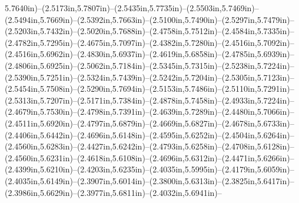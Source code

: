 5.7640in)--(2.5173in,5.7807in)--(2.5435in,5.7735in)--(2.5503in,5.7469in)--(2.5494in,5.7669in)--(2.5392in,5.7663in)--(2.5100in,5.7490in)--(2.5297in,5.7479in)--(2.5203in,5.7432in)--(2.5020in,5.7688in)--(2.4758in,5.7512in)--(2.4584in,5.7335in)--(2.4782in,5.7295in)--(2.4675in,5.7097in)--(2.4382in,5.7280in)--(2.4516in,5.7092in)--(2.4516in,5.6962in)--(2.4830in,5.6937in)--(2.4619in,5.6858in)--(2.4785in,5.6939in)--(2.4806in,5.6925in)--(2.5062in,5.7184in)--(2.5345in,5.7315in)--(2.5238in,5.7224in)--(2.5390in,5.7251in)--(2.5324in,5.7439in)--(2.5242in,5.7204in)--(2.5305in,5.7123in)--(2.5454in,5.7508in)--(2.5290in,5.7694in)--(2.5153in,5.7486in)--(2.5110in,5.7291in)--(2.5313in,5.7207in)--(2.5171in,5.7384in)--(2.4878in,5.7458in)--(2.4933in,5.7224in)--(2.4679in,5.7530in)--(2.4798in,5.7391in)--(2.4639in,5.7289in)--(2.4480in,5.7066in)--(2.4511in,5.6920in)--(2.4797in,5.6879in)--(2.4669in,5.6827in)--(2.4678in,5.6733in)--(2.4406in,5.6442in)--(2.4696in,5.6148in)--(2.4595in,5.6252in)--(2.4504in,5.6264in)--(2.4560in,5.6283in)--(2.4427in,5.6242in)--(2.4793in,5.6258in)--(2.4708in,5.6128in)--(2.4560in,5.6231in)--(2.4618in,5.6108in)--(2.4696in,5.6312in)--(2.4471in,5.6266in)--(2.4399in,5.6210in)--(2.4203in,5.6235in)--(2.4035in,5.5995in)--(2.4179in,5.6059in)--(2.4035in,5.6149in)--(2.3907in,5.6014in)--(2.3800in,5.6313in)--(2.3825in,5.6417in)--(2.3986in,5.6629in)--(2.3977in,5.6811in)--(2.4032in,5.6941in)--
